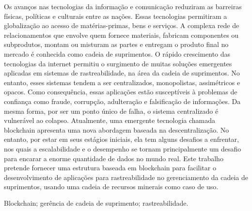 
\resumo
Os avanços nas tecnologias da informação e comunicação reduziram as barreiras físicas, políticas e culturais entre as nações. Essas tecnologias permitiram a globalização ao acesso de matérias-primas, bens e serviços. A complexa rede de relacionamentos que envolve quem fornece materiais, fabricam componentes ou subprodutos, montam ou misturam as partes e entregam o produto final no mercado é conhecida como cadeia de suprimentos. O rápido crescimento das tecnologias da internet permitiu o surgimento de muitas soluções emergentes aplicadas em sistemas de rastreabilidade, na área da cadeia de suprimentos. No entanto, esses sistemas tendem a ser centralizados, monopolistas, assimétricos e opacos. Como consequência, essas aplicações estão susceptíveis à problemas de confiança como fraude, corrupção, adulteração e falsificação de informações. Da mesma forma, por ser um ponto único de falha, o sistema centralizado é vulnerável ao colapso. Atualmente, uma emergente tecnologia chamada blockchain apresenta uma nova abordagem baseada na descentralização. No entanto, por estar em seus estágios iniciais, ela tem alguns desafios a enfrentar, nos quais a escalabilidade e o desempenho se tornam principalmente um desafio para encarar a enorme quantidade de dados no mundo real. Este trabalho pretende fornecer uma estrutura baseada em blockchain para facilitar o desenvolvimento de aplicações para rastreabilidade no gerenciamento da cadeia de suprimentos, usando uma cadeia de recursos minerais como caso de uso.


\begin{keywords}
Blockchain; gerência de cadeia de suprimento; rastreabilidade.
\end{keywords}


